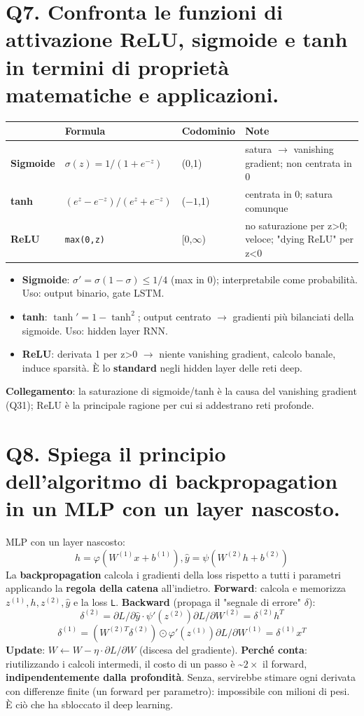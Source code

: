 \documentclass[11pt,a4paper]{article}
\begin{document}
\section*{Q7. Confronta le funzioni di attivazione ReLU, sigmoide e tanh in termini di proprietà matematiche e applicazioni.}
\begin{center}\renewcommand{\arraystretch}{1.25}
\begin{tabular}{|l|l|l|l|}\hline
\textbf{} & \textbf{Formula} & \textbf{Codominio} & \textbf{Note} \\ \hline
\textbf{Sigmoide} & $\sigma (z)=1/(1+e^{-z})$ & (0,1) & satura $\to $ vanishing gradient; non centrata in 0 \\ \hline
\textbf{tanh} & $(e^{z}-e^{-z})/(e^{z}+e^{-z})$ & ($-1$,1) & centrata in 0; satura comunque \\ \hline
\textbf{ReLU} & \texttt{max(0,z)} & [0,$\infty $) & no saturazione per z>0; veloce; "dying ReLU" per z<0 \\ \hline
\end{tabular}\end{center}
\begin{itemize}
\item \textbf{Sigmoide}: $\sigma ' = \sigma (1-\sigma ) \le  1/4$ (max in 0); interpretabile come probabilità. Uso: output binario, gate LSTM.
\item \textbf{tanh}: $\operatorname{tanh}' = 1 - \operatorname{tanh}^{2}$; output centrato $\to $ gradienti più bilanciati della sigmoide. Uso: hidden layer RNN.
\item \textbf{ReLU}: derivata 1 per z>0 $\to $ niente vanishing gradient, calcolo banale, induce sparsità. È lo \textbf{standard} negli hidden layer delle reti deep.
\end{itemize}
\textbf{Collegamento}: la saturazione di sigmoide/tanh è la causa del vanishing gradient (Q31); ReLU è la principale ragione per cui si addestrano reti profonde.
\newpage
\section*{Q8. Spiega il principio dell'algoritmo di backpropagation in un MLP con un layer nascosto.}
MLP con un layer nascosto:
\[ h = \varphi (W^{(1)}x + b^{(1)}),   \hat{y} = \psi (W^{(2)}h + b^{(2)}) \]
La \textbf{backpropagation} calcola i gradienti della loss rispetto a tutti i parametri applicando la \textbf{regola della catena} all'indietro.
\textbf{Forward}: calcola e memorizza $z^{(1)}, h, z^{(2)}, \hat{y}$ e la loss \texttt{L}.
\textbf{Backward} (propaga il "segnale di errore" $\delta $):
\[ \delta ^{(2)} = \partial L/\partial \hat{y} \cdot  \psi '(z^{(2)})              \partial L/\partial W^{(2)} = \delta ^{(2)} h^{T} \]
\[ \delta ^{(1)} = (W^{(2)T} \delta ^{(2)}) \odot  \varphi '(z^{(1)})      \partial L/\partial W^{(1)} = \delta ^{(1)} x^{T} \]
\textbf{Update}: $W \leftarrow  W - \eta  \cdot  \partial L/\partial W$ (discesa del gradiente).
\textbf{Perché conta}: riutilizzando i calcoli intermedi, il costo di un passo è \textasciitilde{}$2\times $ il forward, \textbf{indipendentemente dalla profondità}. Senza, servirebbe stimare ogni derivata con differenze finite (un forward per parametro): impossibile con milioni di pesi. È ciò che ha sbloccato il deep learning.
\newpage
\end{document}
